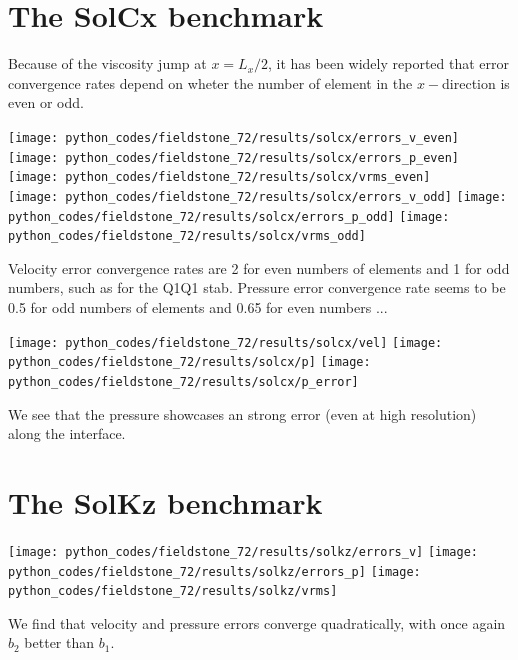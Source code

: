 \section*{The SolCx benchmark}

Because of the viscosity jump at $x=L_x/2$, it has been widely reported that 
error convergence rates depend on wheter the number of element in the $x-$direction 
is even or odd.

\begin{center}
\texttt{[image: python\_codes/fieldstone\_72/results/solcx/errors\_v\_even]}
\texttt{[image: python\_codes/fieldstone\_72/results/solcx/errors\_p\_even]}
\texttt{[image: python\_codes/fieldstone\_72/results/solcx/vrms\_even]}\\
\texttt{[image: python\_codes/fieldstone\_72/results/solcx/errors\_v\_odd]}
\texttt{[image: python\_codes/fieldstone\_72/results/solcx/errors\_p\_odd]}
\texttt{[image: python\_codes/fieldstone\_72/results/solcx/vrms\_odd]}
\end{center}

Velocity error convergence rates are 2 for even numbers of elements and 1 for odd numbers, 
such as for the Q1Q1 stab. 
Pressure error convergence rate seems to be 0.5 for odd numbers of elements and
0.65 for even numbers ... 

\begin{center}
\texttt{[image: python\_codes/fieldstone\_72/results/solcx/vel]}
\texttt{[image: python\_codes/fieldstone\_72/results/solcx/p]}
\texttt{[image: python\_codes/fieldstone\_72/results/solcx/p\_error]}
\end{center}

We see that the pressure showcases an strong error (even at high resolution)
along the interface. 


\section*{The SolKz benchmark}

\begin{center}
\texttt{[image: python\_codes/fieldstone\_72/results/solkz/errors\_v]}
\texttt{[image: python\_codes/fieldstone\_72/results/solkz/errors\_p]}
\texttt{[image: python\_codes/fieldstone\_72/results/solkz/vrms]}
\end{center}

We find that velocity and pressure errors converge quadratically, with 
once again $b_2$ better than $b_1$.


